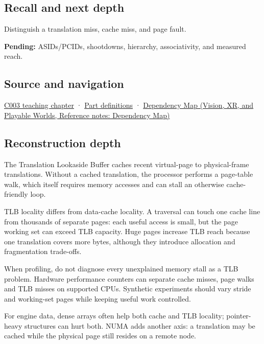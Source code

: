 \subsection{Recall and next depth}\label{appendix-7a2d9c5ce511-recall-and-next-depth}

\hypertarget{appendix-7a2d9c5ce511-recall-and-next-depth}{}

Distinguish a translation miss, cache miss, and page fault.

\textbf{Pending:} ASIDs/PCIDs, shootdowns, hierarchy, associativity, and measured reach.

\subsection{Source and navigation}\label{appendix-7a2d9c5ce511-source-and-navigation}

\hypertarget{appendix-7a2d9c5ce511-source-and-navigation}{}

\hyperref[01-foundations-i-ch002-where-the-bytes-live]{C003 teaching chapter} · \hyperref[appendix-fd090d982a15-m003---parts-41-60]{Part definitions} · \href{../07-Vision-XR-and-Playable-Worlds/main.pdf\#nameddest=appendix-4ad47bdd269a}{Dependency Map (Vision, XR, and Playable Worlds, Reference notes: Dependency Map)}

\subsection{Reconstruction depth}\label{appendix-7a2d9c5ce511-reconstruction-depth}

\hypertarget{appendix-7a2d9c5ce511-reconstruction-depth}{}

The Translation Lookaside Buffer caches recent virtual-page to physical-frame translations. Without a cached translation, the processor performs a page-table walk, which itself requires memory accesses and can stall an otherwise cache-friendly loop.

TLB locality differs from data-cache locality. A traversal can touch one cache line from thousands of separate pages: each useful access is small, but the page working set can exceed TLB capacity. Huge pages increase TLB reach because one translation covers more bytes, although they introduce allocation and fragmentation trade-offs.

When profiling, do not diagnose every unexplained memory stall as a TLB problem. Hardware performance counters can separate cache misses, page walks and TLB misses on supported CPUs. Synthetic experiments should vary stride and working-set pages while keeping useful work controlled.

For engine data, dense arrays often help both cache and TLB locality; pointer-heavy structures can hurt both. NUMA adds another axis: a translation may be cached while the physical page still resides on a remote node.
